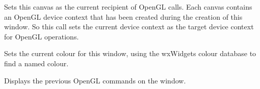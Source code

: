 
Sets this canvas as the current recipient of OpenGL calls.
Each canvas contains an OpenGL device context that has been created during
the creation of this window. So this call sets the current device context
as the target device context for OpenGL operations.

\label{wxglcanvassetcolour}


Sets the current colour for this window, using the wxWidgets colour database to find a named colour.

\label{wxglcanvasswapbuffers}


Displays the previous OpenGL commands on the window.


